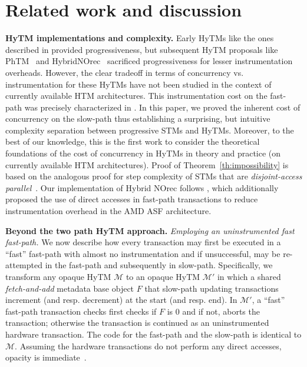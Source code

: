 \section{Related work and discussion}
\label{sec:rel}
%
\vspace{1mm}\noindent\textbf{HyTM implementations and complexity.}
Early HyTMs like the ones described in \cite{damronhytm, kumarhytm} provided progressiveness, but
subsequent HyTM proposals like PhTM~\cite{phasedtm} and HybridNOrec~\cite{hybridnorec} sacrificed progressiveness for lesser instrumentation overheads.
However, the clear tradeoff in terms of concurrency vs. instrumentation for these HyTMs have not been studied in the context of currently available HTM
architectures. This instrumentation cost on the fast-path was precisely characterized in \cite{htmdisc15}.
In this paper, we proved the inherent cost of concurrency on the slow-path thus establishing a surprising, 
but intuitive complexity separation between progressive STMs and HyTMs.
Moreover, to the best of our knowledge, this is the first work to consider the theoretical foundations of the cost of concurrency in 
HyTMs in theory and practice (on currently available HTM architectures).
Proof of Theorem~\ref{th:impossibility} is based on the analogous proof for step complexity of STMs that are \emph{disjoint-access parallel}~\cite{prog15-pact, tm-book}.
Our implementation of Hybrid NOrec follows \cite{hynorecriegel}, which additionally proposed the use of direct accesses
in fast-path transactions to reduce instrumentation overhead in the AMD ASF architecture.

\vspace{1mm}\noindent\textbf{Beyond the two path HyTM approach.}
\vspace{1mm}\noindent\textit{Employing an uninstrumented fast fast-path.}
We now describe how every transaction may first be executed in a ``fast'' fast-path with almost no instrumentation
and if unsuccessful, may be re-attempted in the fast-path and subsequently in slow-path.
Specifically, we transform any opaque HyTM $\mathcal{M}$ to an opaque
HyTM $\mathcal{M}'$ in which a shared \emph{fetch-and-add} metadata base object $F$ that slow-path updating transactions
increment (and resp. decrement) at the start (and resp. end). In $\mathcal{M}'$, a ``fast'' fast-path transaction checks first checks if $F$ is $0$
and if not, aborts the transaction; otherwise the transaction is continued as an uninstrumented hardware transaction.
The code for the fast-path and the slow-path is identical to $\mathcal{M}$.
Assuming the hardware transactions do not perform any direct accesses, opacity is immediate~\cite{brownfaster15}.

